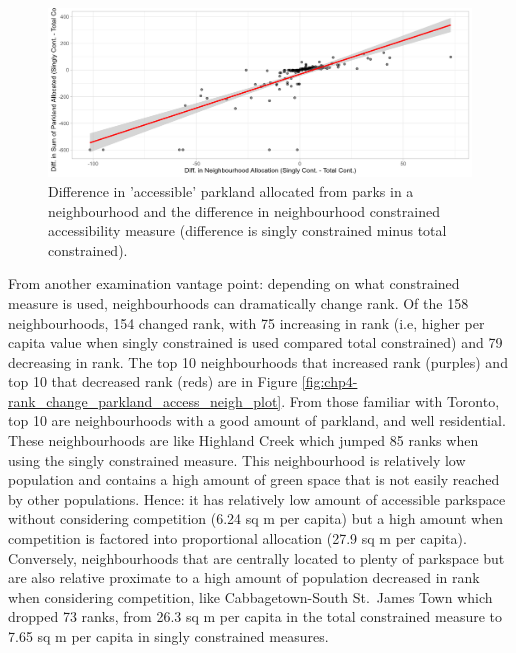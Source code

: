 \documentclass[
11pt, %
oneside, %
english, %
singlespacing, %
]{macthesis} %
\begin{document}
\begin{figure}

{\centering \includegraphics[width=6in]{./data/figures/chp4-diff_in_parkallocated_and_neigh_plot} 

}

\caption{\label{fig:chp4-diff_in_parkallocated_and_neigh_plot}Difference in 'accessible' parkland allocated from parks in a neighbourhood and the difference in neighbourhood constrained accessibility measure (difference is singly constrained minus total constrained).}\label{fig:unnamed-chunk-65}
\end{figure}

From another examination vantage point: depending on what constrained measure is used, neighbourhoods can dramatically change rank. Of the 158 neighbourhoods, 154 changed rank, with 75 increasing in rank (i.e, higher per capita value when singly constrained is used compared total constrained) and 79 decreasing in rank. The top 10 neighbourhoods that increased rank (purples) and top 10 that decreased rank (reds) are in Figure \ref{fig:chp4-rank_change_parkland_access_neigh_plot}. From those familiar with Toronto, top 10 are neighbourhoods with a good amount of parkland, and well residential. These neighbourhoods are like Highland Creek which jumped 85 ranks when using the singly constrained measure. This neighbourhood is relatively low population and contains a high amount of green space that is not easily reached by other populations. Hence: it has relatively low amount of accessible parkspace without considering competition (6.24 sq m per capita) but a high amount when competition is factored into proportional allocation (27.9 sq m per capita). Conversely, neighbourhoods that are centrally located to plenty of parkspace but are also relative proximate to a high amount of population decreased in rank when considering competition, like Cabbagetown-South St.~James Town which dropped 73 ranks, from 26.3 sq m per capita in the total constrained measure to 7.65 sq m per capita in singly constrained measures.
\end{document}

